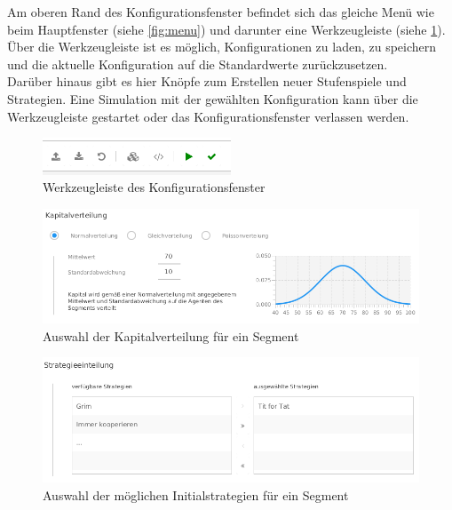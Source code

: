 \documentclass[parskip=full,11pt]{scrartcl}
\begin{document}
Am oberen Rand des Konfigurationsfenster befindet sich das gleiche Menü wie beim Hauptfenster (siehe \cref{fig:menu}) und darunter eine Werkzeugleiste (siehe \cref{fig:konfig_tool}). Über die Werkzeugleiste ist es möglich, Konfigurationen zu laden, zu speichern und die aktuelle Konfiguration auf die Standardwerte zurückzusetzen.\\Darüber hinaus gibt es hier Knöpfe zum Erstellen neuer Stufenspiele und Strategien. Eine Simulation mit der gewählten Konfiguration kann über die Werkzeugleiste gestartet oder das Konfigurationsfenster verlassen werden.

\begin{figure}[hb]
	\centering
	\includegraphics[width=0.5\textwidth]{images/konfig_tool2.png}
	\caption{\label{fig:konfig_tool}
		Werkzeugleiste des Konfigurationsfenster}
\end{figure}

\begin{figure}[hb]
	\centering
	\includegraphics[width=\textwidth]{images/konfig_cap.png}
	\caption{\label{fig:konfig_cap}
		Auswahl der Kapitalverteilung für ein Segment}
\end{figure}

\begin{figure}[hb]
	\centering
	\includegraphics[width=\textwidth]{images/konfig_strat.png}
	\caption{\label{fig:konfig_strat}
		Auswahl der möglichen Initialstrategien für ein Segment}
\end{figure}
\end{document}
